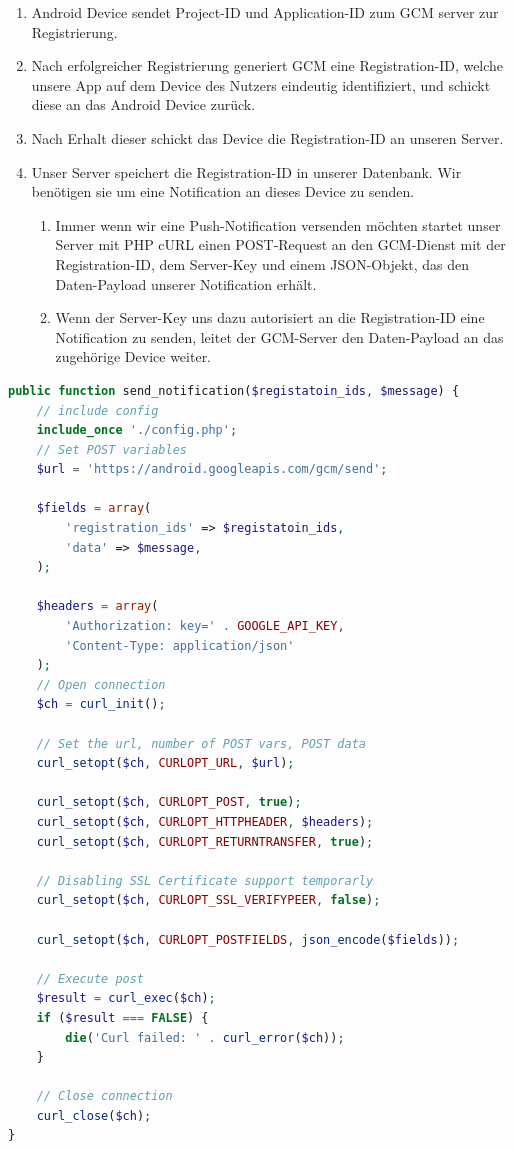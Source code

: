 \documentclass{report}
\begin{document}
\begin{enumerate}
\item Android Device sendet Project-ID und Application-ID zum GCM server zur Registrierung.
\item Nach erfolgreicher Registrierung generiert GCM eine Registration-ID, welche unsere App auf dem Device des Nutzers eindeutig identifiziert, und schickt diese an das Android Device zurück.
\item Nach Erhalt dieser schickt das Device die Registration-ID an unseren Server.
\item Unser Server speichert die Registration-ID in unserer Datenbank. Wir benötigen sie um eine Notification an dieses Device zu senden.
    \begin{enumerate} 
        \item Immer wenn wir eine Push-Notification versenden möchten startet unser Server mit PHP cURL einen POST-Request an den GCM-Dienst mit der Registration-ID, dem Server-Key und einem JSON-Objekt, das den Daten-Payload unserer Notification erhält.
        \item Wenn der Server-Key uns dazu autorisiert an die Registration-ID eine Notification zu senden, leitet der GCM-Server den Daten-Payload an das zugehörige Device weiter.
    \end{enumerate}
\end{enumerate}
\begin{lstlisting}[language=PHP, caption=PHP Funktion sendet POST-Request via cURL an GCM-Server , label=cbsp9]
public function send_notification($registatoin_ids, $message) {
    // include config
    include_once './config.php';
    // Set POST variables
    $url = 'https://android.googleapis.com/gcm/send';
    
    $fields = array(
        'registration_ids' => $registatoin_ids,
        'data' => $message,
    );
 
    $headers = array(
        'Authorization: key=' . GOOGLE_API_KEY,
        'Content-Type: application/json'
    );
    // Open connection
    $ch = curl_init();
 
    // Set the url, number of POST vars, POST data
    curl_setopt($ch, CURLOPT_URL, $url);
 
    curl_setopt($ch, CURLOPT_POST, true);
    curl_setopt($ch, CURLOPT_HTTPHEADER, $headers);
    curl_setopt($ch, CURLOPT_RETURNTRANSFER, true);
 
    // Disabling SSL Certificate support temporarly
    curl_setopt($ch, CURLOPT_SSL_VERIFYPEER, false);
 
    curl_setopt($ch, CURLOPT_POSTFIELDS, json_encode($fields));
 
    // Execute post
    $result = curl_exec($ch);
    if ($result === FALSE) {
        die('Curl failed: ' . curl_error($ch));
    }
 
    // Close connection
    curl_close($ch);
}
\end{lstlisting}
\end{document}
